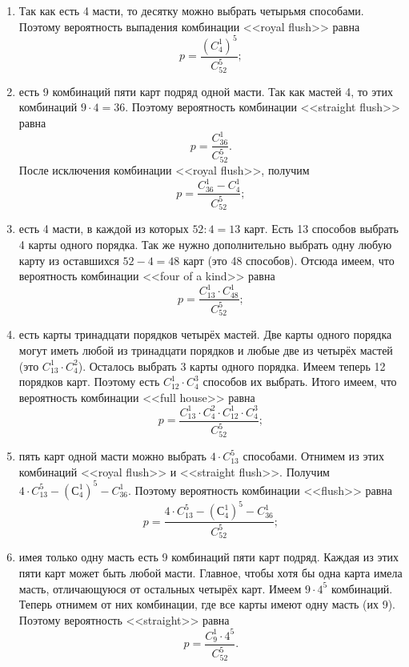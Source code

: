 \begin{enumerate}[label=\alph*)]
\item Так как есть 4 масти, то десятку можно выбрать четырьмя способами.
Поэтому вероятность выпадения комбинации <<royal flush>> равна
$$ p =
\frac{ \left( C_4^1 \right)^5 }{ C_{52}^5 };$$

\item есть 9 комбинаций пяти карт подряд одной масти.
Так как мастей 4, то этих комбинаций $ 9 \cdot 4 = 36 $.
Поэтому вероятность комбинации <<straight flush>> равна
$$ p =
\frac{ C_{36}^1 }{ C_{52}^5 }.$$
После исключения комбинации <<royal flush>>, получим
$$ p =
\frac{ C_{36}^1 - C_4^1 }{ C_{52}^5 };$$

\item есть 4 масти, в каждой из которых $ 52 : 4 = 13 $ карт.
Есть 13 способов выбрать 4 карты одного порядка.
Так же нужно дополнительно выбрать одну любую карту из оставшихся $ 52 - 4 = 48 $ карт (это 48 способов).
Отсюда имеем, что вероятность комбинации <<four of a kind>> равна
$$ p =
\frac{ C_{13}^1 \cdot C_{48}^1 }{ C_{52}^5 };$$

\item есть карты тринадцати порядков четырёх мастей.
Две карты одного порядка могут иметь любой из тринадцати порядков и любые две из четырёх мастей (это $ C_{13}^1 \cdot C_4^2 $).
Осталось выбрать 3 карты одного порядка. Имеем теперь 12 порядков карт.
Поэтому есть $ C_{12}^1 \cdot C_4^3 $ способов их выбрать.
Итого имеем, что вероятность комбинации <<full house>> равна
$$ p =
\frac{ C_{13}^1 \cdot C_4^2 \cdot C_{12}^1 \cdot C_4^3 }{ C_{52}^5 };$$

\item пять карт одной масти можно выбрать $ 4 \cdot C_{13}^5 $ способами.
Отнимем из этих комбинаций <<royal flush>> и <<straight flush>>.
Получим $ 4 \cdot C_{13}^5 - \left( С_4^1 \right)^5 - C_{36}^1 $.
Поэтому вероятность комбинации <<flush>> равна
$$ p =
\frac{ 4 \cdot C_{13}^5 - \left( С_4^1 \right)^5 - C_{36}^1 }{ C_{52}^5 };$$

\item имея только одну масть есть 9 комбинаций пяти карт подряд.
Каждая из этих пяти карт может быть любой масти.
Главное, чтобы хотя бы одна карта имела масть, отличающуюся от остальных четырёх карт.
Имеем $ 9 \cdot 4^5 $ комбинаций.
Теперь отнимем от них комбинации, где все карты имеют одну масть (их 9).
Поэтому вероятность <<straight>> равна
$$ p =
\frac{ C_9^1 \cdot 4^5 }{ C_{52}^5 }.$$
\end{enumerate}


